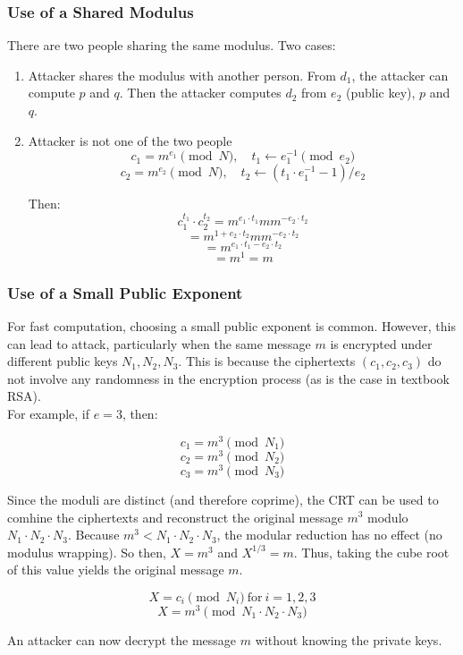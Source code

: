 \subsubsection{Use of a Shared Modulus}
There are two people sharing the same modulus. Two cases:
\begin{enumerate}
    \item Attacker shares the modulus with another person. From $d_1$, the attacker can compute $p$ and $q$. Then the attacker computes $d_2$ from $e_2$ (public key), $p$ and $q$.
    \item Attacker is not one of the two people
    \[ c_1 = m^{e_1} \pmod{N} , \quad t_1 \leftarrow e_1^{-1} \pmod{e_2}\]
    \[ c_2 = m^{e_2} \pmod{N} , \quad t_2 \leftarrow (t_1 \cdot e_1^{-1} -1) / e_2\]
    
    Then:
    \[ c_1^{t_1} \cdot c_2^{t_2} = m^{e_1 \cdot t_1}mm^{-e_2 \cdot t_2} \]
    \[ = m^{1 + e_2 \cdot t_2}mm^{-e_2 \cdot t_2} \]
    \[ = m^{e_1 \cdot t_1 -e_2 \cdot t_2} \]
    \[ = m^1 = m\]
\end{enumerate}

\subsubsection{Use of a Small Public Exponent}
For fast computation, choosing a small public exponent is common.
However, this can lead to attack, particularly when the same message $m$ 
is encrypted under different public keys $N_1, N_2, N_3$.
This is because the ciphertexts $(c_1, c_2, c_3)$ do not involve any randomness in the encryption process (as is the case in textbook RSA). \\

For example, if $e = 3$, then:

\[ c_1 = m^3 \pmod{N_1} \]
\[ c_2 = m^3 \pmod{N_2} \]
\[ c_3 = m^3 \pmod{N_3} \]

Since the moduli are distinct (and therefore coprime), the CRT can be used to comhine the ciphertexts 
and reconstruct the original message $m^3$ modulo $N_1 \cdot N_2 \cdot N_3$. 
Because $m^3 < N_1 \cdot N_2 \cdot N_3$, the modular reduction has no effect (no modulus wrapping).
So then, $X= m^3$ and $X^{1/3} = m$.
Thus, taking the cube root of this value yields the original message $m$.

\[ X = c_i \pmod{N_i} \  \text{for} \ i = 1,2,3 \]
\[ X = m^3 \pmod{N_1 \cdot N_2 \cdot N_3} \]

An attacker can now decrypt the message $m$ without knowing the private keys.

